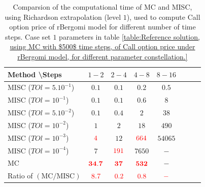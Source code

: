 \documentclass[11pt]{article}
\begin{document}
\begin{table}[!h]
	\centering
	\begin{tabular}{l*{6}{c}r}
		Method \textbackslash  Steps            & $1-2$ & $2-4$ & $4-8$ & $8-16$ &   \\
		\hline
		MISC ($TOl=5.10^{-1}$)  & $0.1$ & $0.1$ & $0.2$ & $0.5$  \\
		MISC ($TOl=10^{-1}$)  & $0.1$ & $0.1$ & $0.6$ & $8$  \\
		MISC ($TOl=5.10^{-2}$)  & $0.1$ & $0.4$ & $2$ & $38$  \\
		MISC ($TOl=10^{-2}$)  & $1$ & $2$ & $18$ & $490$  \\
		MISC ($TOl=10^{-3}$)  & ${\color{red}4}$ & $12$ & ${\color{red}664}$ & $54065$  \\	
		MISC ($TOl=10^{-4}$)  & $7$ & ${\color{red}191}$ & $7650$ & $-$  \\
		\hline
			MC   & $\mathbf{{\color{red} 34.7}}$  & $\mathbf{{\color{red}37}}$  & $\mathbf{ {\color{red}532}}$ &$\mathbf{-}$   \\
		\hline
			Ratio of $\left(\text{MC}/ \text{MISC} \right)$  &${\color{red}8.7}$ & ${\color{red}   0.2
		}$  & ${\color{red} 0.8
		}$  & ${\color{red}-}$ \\
		\hline
	\end{tabular}
	\caption{Comparsion of the computational time of  MC and MISC, using Richardson extrapolation (level $1$), used to compute Call option price of rBergomi model for different number of time steps. Case set $1$ parameters in table \ref{table:Reference solution, using MC with $500$ time steps, of Call option price under rBergomi model, for different parameter constellation.}}
	\label{Comparsion of the computational time of  MC and MISC, using Richardson extrapolation (level $1$), used to compute Call option price of rBergomi model for different number of time steps. Case set $1$ parameters}
\end{table}
\end{document}
